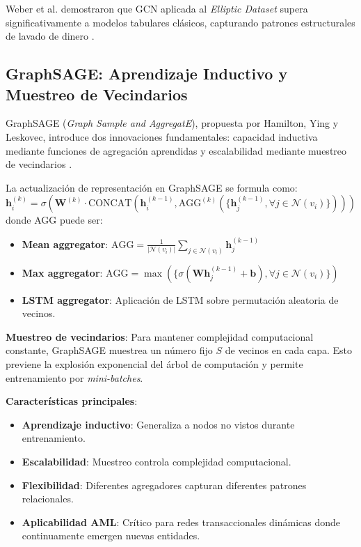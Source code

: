 Weber et al. demostraron que GCN aplicada al \textit{Elliptic Dataset} supera significativamente a modelos tabulares clásicos, capturando patrones estructurales de lavado de dinero \cite{Weber2019Anti-MoneyForensics}.

\subsection{GraphSAGE: Aprendizaje Inductivo y Muestreo de Vecindarios}

GraphSAGE (\textit{Graph Sample and AggregatE}), propuesta por Hamilton, Ying y Leskovec, introduce dos innovaciones fundamentales: capacidad inductiva mediante funciones de agregación aprendidas y escalabilidad mediante muestreo de vecindarios \cite{Hamilton2017InductiveGraphs}.

La actualización de representación en GraphSAGE se formula como:
\[ \mathbf{h}_i^{(k)} = \sigma(\mathbf{W}^{(k)} \cdot \text{CONCAT}(\mathbf{h}_i^{(k-1)}, \text{AGG}^{(k)}(\{\mathbf{h}_j^{(k-1)}, \forall j \in \mathcal{N}(v_i)\}))) \]
donde AGG puede ser:
\begin{itemize}
    \item \textbf{Mean aggregator}: $\text{AGG} = \frac{1}{|\mathcal{N}(v_i)|} \sum_{j \in \mathcal{N}(v_i)} \mathbf{h}_j^{(k-1)}$
    \item \textbf{Max aggregator}: $\text{AGG} = \max(\{\sigma(\mathbf{W} \mathbf{h}_j^{(k-1)} + \mathbf{b}), \forall j \in \mathcal{N}(v_i)\})$
    \item \textbf{LSTM aggregator}: Aplicación de LSTM sobre permutación aleatoria de vecinos.
\end{itemize}

\textbf{Muestreo de vecindarios}: Para mantener complejidad computacional constante, GraphSAGE muestrea un número fijo $S$ de vecinos en cada capa. Esto previene la explosión exponencial del árbol de computación y permite entrenamiento por \textit{mini-batches}.

\textbf{Características principales}:
\begin{itemize}
    \item \textbf{Aprendizaje inductivo}: Generaliza a nodos no vistos durante entrenamiento.
    \item \textbf{Escalabilidad}: Muestreo controla complejidad computacional.
    \item \textbf{Flexibilidad}: Diferentes agregadores capturan diferentes patrones relacionales.
    \item \textbf{Aplicabilidad AML}: Crítico para redes transaccionales dinámicas donde continuamente emergen nuevas entidades.
\end{itemize}

